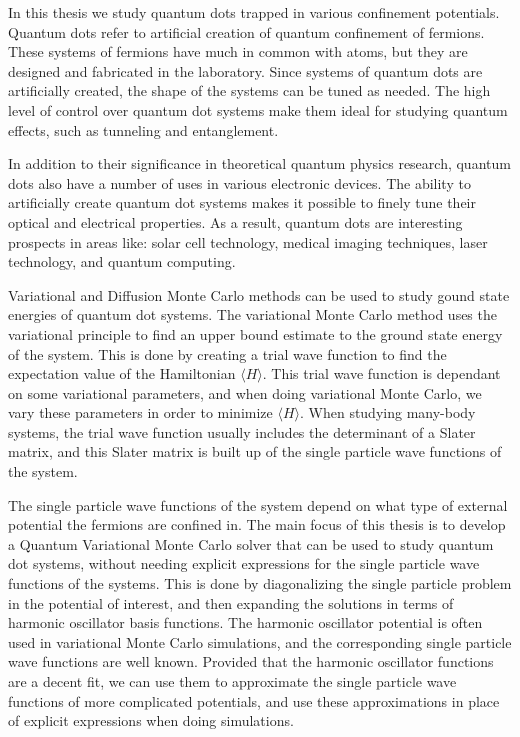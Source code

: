 \documentclass[../main.tex]{subfiles}
\begin{document}
In this thesis we study quantum dots trapped in various confinement potentials. Quantum dots refer to artificial creation of quantum confinement of fermions. These systems of fermions have much in common with atoms, but they are designed and fabricated in the laboratory\cite{Manninen}. Since systems of quantum dots are artificially created, the shape of the systems can be tuned as needed. The high level of control over quantum dot systems make them ideal for studying quantum effects, such as tunneling and entanglement. 

In addition to their significance in theoretical quantum physics research, quantum dots also have a number of uses in various electronic devices. The ability to artificially create quantum dot systems makes it possible to finely tune their optical and electrical properties. As a result, quantum dots are interesting prospects in areas like: solar cell technology\cite{QDotSolar, QDotSolar2}, medical imaging techniques\cite{QDotMed, QDotMed2}, laser technology\cite{QDotLaser, QDotLaser2}, and quantum computing\cite{QDotComp, QDotComp2}.

Variational and Diffusion Monte Carlo methods can be used to study gound state energies of quantum dot systems\cite{QMC1, QMC2, QMC3, QDotBenchmarks}. The variational Monte Carlo method uses the variational principle to find an upper bound estimate to the ground state energy of the system. This is done by creating a trial wave function to find the expectation value of the Hamiltonian $\langle H \rangle$. This trial wave function is dependant on some variational parameters, and when doing variational Monte Carlo, we vary these parameters in order to minimize $\langle H \rangle$. When studying many-body systems, the trial wave function usually includes the determinant of a Slater matrix, and this Slater matrix is built up of the single particle wave functions of the system.

The single particle wave functions of the system depend on what type of external potential the fermions are confined in. The main focus of this thesis is to develop a Quantum Variational Monte Carlo solver that can be used to study quantum dot systems, without needing explicit expressions for the single particle wave functions of the systems. This is done by diagonalizing the single particle problem in the potential of interest, and then expanding the solutions in terms of harmonic oscillator basis functions. The harmonic oscillator potential is often used in variational Monte Carlo simulations, and the corresponding single particle wave functions are well known. Provided that the harmonic oscillator functions are a decent fit, we can use them to approximate the single particle wave functions of more complicated potentials, and use these approximations in place of explicit expressions when doing simulations.
\end{document}
